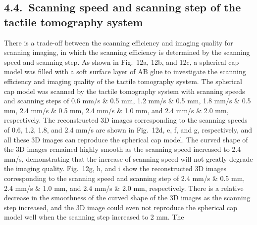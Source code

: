 \documentclass[11pt]{article}
\begin{document}
\subsection*{4.4.\ Scanning speed and scanning step of the tactile tomography system}

There is a trade-off between the scanning efficiency and imaging
quality for scanning imaging, in which the scanning efficiency is
determined by the scanning speed and scanning step. As shown in
Fig.~12a, 12b, and 12c, a spherical cap model was filled with a
soft surface layer of AB glue to investigate the scanning
efficiency and imaging quality of the tactile tomography system.
The spherical cap model was scanned by the tactile tomography
system with scanning speeds and scanning steps of 0.6 mm/s \& 0.5
mm, 1.2 mm/s \& 0.5 mm, 1.8 mm/s \& 0.5 mm, 2.4 mm/s \& 0.5 mm,
2.4 mm/s \& 1.0 mm, and 2.4 mm/s \& 2.0 mm, respectively. The
reconstructed 3D images corresponding to the scanning speeds of
0.6, 1.2, 1.8, and 2.4 mm/s are shown in Fig.~12d, e, f, and g,
respectively, and all these 3D images can reproduce the spherical
cap model. The curved shape of the 3D images remained highly smooth
as the scanning speed increased to 2.4 mm/s, demonstrating that
the increase of scanning speed will not greatly degrade the imaging
quality. Fig.~12g, h, and i show the reconstructed 3D images
corresponding to the scanning speed and scanning step of 2.4 mm/s
\& 0.5 mm, 2.4 mm/s \& 1.0 mm, and 2.4 mm/s \& 2.0 mm,
respectively. There is a relative decrease in the smoothness of
the curved shape of the 3D images as the scanning step increased,
and the 3D image could even not reproduce the spherical cap model
well when the scanning step increased to 2 mm. The
\end{document}
